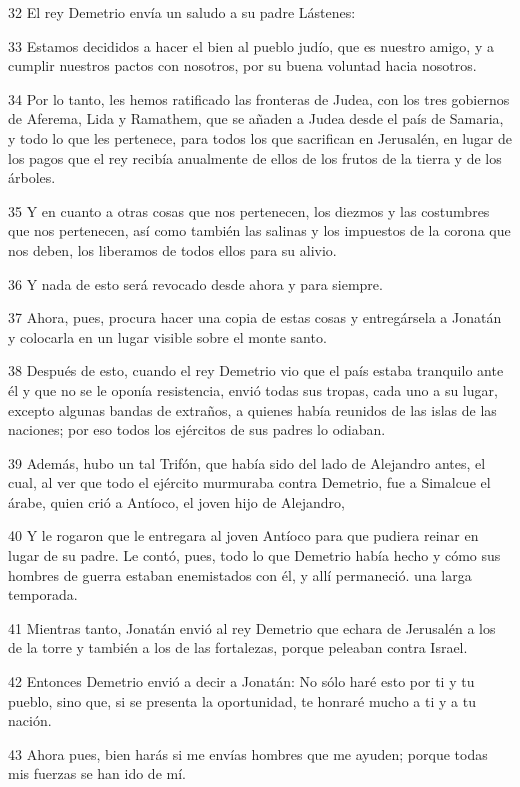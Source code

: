 \par 32 El rey Demetrio envía un saludo a su padre Lástenes:
\par 33 Estamos decididos a hacer el bien al pueblo judío, que es nuestro amigo, y a cumplir nuestros pactos con nosotros, por su buena voluntad hacia nosotros.
\par 34 Por lo tanto, les hemos ratificado las fronteras de Judea, con los tres gobiernos de Aferema, Lida y Ramathem, que se añaden a Judea desde el país de Samaria, y todo lo que les pertenece, para todos los que sacrifican en Jerusalén, en lugar de los pagos que el rey recibía anualmente de ellos de los frutos de la tierra y de los árboles.
\par 35 Y en cuanto a otras cosas que nos pertenecen, los diezmos y las costumbres que nos pertenecen, así como también las salinas y los impuestos de la corona que nos deben, los liberamos de todos ellos para su alivio.
\par 36 Y nada de esto será revocado desde ahora y para siempre.
\par 37 Ahora, pues, procura hacer una copia de estas cosas y entregársela a Jonatán y colocarla en un lugar visible sobre el monte santo.
\par 38 Después de esto, cuando el rey Demetrio vio que el país estaba tranquilo ante él y que no se le oponía resistencia, envió todas sus tropas, cada uno a su lugar, excepto algunas bandas de extraños, a quienes había reunidos de las islas de las naciones; por eso todos los ejércitos de sus padres lo odiaban.
\par 39 Además, hubo un tal Trifón, que había sido del lado de Alejandro antes, el cual, al ver que todo el ejército murmuraba contra Demetrio, fue a Simalcue el árabe, quien crió a Antíoco, el joven hijo de Alejandro,
\par 40 Y le rogaron que le entregara al joven Antíoco para que pudiera reinar en lugar de su padre. Le contó, pues, todo lo que Demetrio había hecho y cómo sus hombres de guerra estaban enemistados con él, y allí permaneció. una larga temporada.
\par 41 Mientras tanto, Jonatán envió al rey Demetrio que echara de Jerusalén a los de la torre y también a los de las fortalezas, porque peleaban contra Israel.
\par 42 Entonces Demetrio envió a decir a Jonatán: No sólo haré esto por ti y tu pueblo, sino que, si se presenta la oportunidad, te honraré mucho a ti y a tu nación.
\par 43 Ahora pues, bien harás si me envías hombres que me ayuden; porque todas mis fuerzas se han ido de mí.
